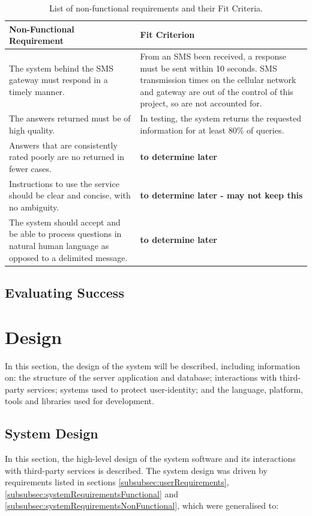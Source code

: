 \documentclass{article}
\begin{document}
\begin{table}
\begin{center}
    \begin{tabular}{| p{6.0cm} | p{6.0cm} |}
    \hline
    Non-Functional Requirement & Fit Criterion \\ \hline
    The system behind the SMS gateway must respond in a timely manner.  & From an SMS been received, a response must be sent within 10 seconds.  SMS transmission times on the cellular network and gateway are out of the control of this project, so are not accounted for. \\ \hline
    The answers returned must be of high quality.  & In testing, the system returns the requested information for at least 80\% of queries. \\ \hline
    Answers that are consistently rated poorly are no returned in fewer cases.  & {\bf to determine later} \\ \hline %
    Instructions to use the service should be clear and concise, with no ambiguity.  & {\bf to determine later - may not keep this} \\ \hline %
    The system should accept and be able to process questions in natural human language as opposed to a delimited message. & {\bf to determine later} \\ \hline %
    \end{tabular}
    \caption{List of non-functional requirements and their Fit Criteria.}
    \label{table:nonFunctionalRequirementsFitCrit}
\end{center}
\end{table}

\subsection{Evaluating Success}

\newpage
\section{Design}
\label{sec:design}
In this section, the design of the system will be described, including information on: the structure of the server application and database; interactions with third-party services; systems used to protect user-identity; and the language, platform, tools and libraries used for development.

\subsection{System Design}
In this section, the high-level design of the system software and its interactions with third-party services is described.  The system design was driven by requirements listed in sections \ref{subsubsec:userRequirements}, \ref{subsubsec:systemRequirementsFunctional} and \ref{subsubsec:systemRequirementsNonFunctional}, which were generalised to:
\end{document}
